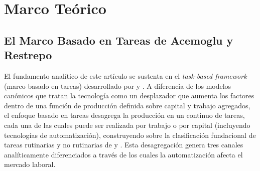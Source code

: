 \documentclass{article}
\begin{document}
\FloatBarrier

\section{Marco Te\'orico}
\label{sec:theory}

\subsection{El Marco Basado en Tareas de Acemoglu y Restrepo}
\label{subsec:task_framework}

El fundamento anal\'itico de este art\'iculo se sustenta en el \textit{task-based framework} (marco basado en tareas) desarrollado por \cite{acemoglu2019automation} y \cite{acemoglu2020robots}. A diferencia de los modelos can\'onicos que tratan la tecnolog\'ia como un desplazador que aumenta los factores dentro de una funci\'on de producci\'on definida sobre capital y trabajo agregados, el enfoque basado en tareas desagrega la producci\'on en un continuo de tareas, cada una de las cuales puede ser realizada por trabajo o por capital (incluyendo tecnolog\'ias de automatizaci\'on), construyendo sobre la clasificaci\'on fundacional de tareas rutinarias y no rutinarias de \cite{autor2003} y \cite{levy2004}. Esta desagregaci\'on genera tres canales anal\'iticamente diferenciados a trav\'es de los cuales la automatizaci\'on afecta el mercado laboral.
\end{document}
